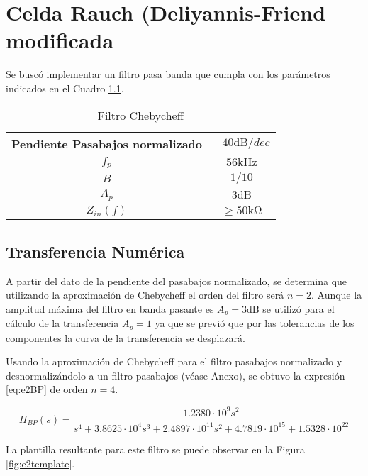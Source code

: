 
\chapter{Celda Rauch (Deliyannis-Friend modificada}


Se buscó implementar un filtro pasa banda que cumpla con los parámetros indicados en el Cuadro \ref{tab:e2spec}.

\begin{table}[ht]
\begin{center}
\begin{tabular}{||c|c||}
\hline
Pendiente Pasabajos normalizado	&	$-40 \si{\deci\bel}/dec$ \\
\hline
$f_p$ & $56 \si{\kilo\hertz}$\\
\hline
$B$ & $1/10$\\
\hline
$A_p$ & $3\si{\deci\bel}$\\
\hline
$Z_{in}(f)$ & $\geq 50 \si{\kilo\ohm}$\\
\hline
\end{tabular}
\caption{Filtro Chebycheff}
\label{tab:e2spec}
\end{center}
\end{table}

\section{Transferencia Numérica}

A partir del dato de la pendiente del pasabajos normalizado, se determina que utilizando la aproximación de Chebycheff el orden del filtro será $n=2$. Aunque la amplitud máxima del filtro en banda pasante es $A_p = 3 \si{\deci\bel}$ se utilizó para el cálculo de la transferencia $A_p = 1$ ya que se previó que por las tolerancias de los componentes la curva de la transferencia se desplazará.

Usando la aproximación de Chebycheff para el filtro pasabajos normalizado y desnormalizándolo a un filtro pasabajos (véase Anexo), se obtuvo la expresión \eqref{eq:e2BP} de orden $n=4$.

\begin{equation}
H_{BP}(s)=\frac{1.2380\cdot10^9s^2}{s^4+3.8625\cdot10^4 s^3+2.4897\cdot10^{11}s^2+4.7819\cdot10^{15}+1.5328\cdot10^{22}}
\label{eq:e2BP}
\end{equation}

La plantilla resultante para este filtro se puede observar en la Figura \ref{fig:e2template}.

